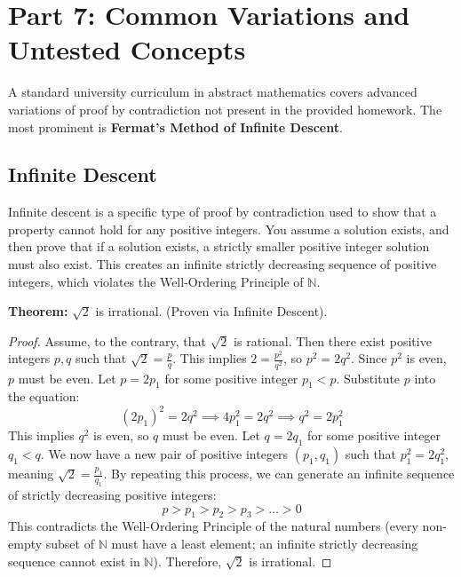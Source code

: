 \documentclass[11pt, letterpaper]{article}
\theoremstyle{remark}
\newcommand{\N}{\mathbb{N}}
\begin{document}
\newpage
\section{Part 7: Common Variations and Untested Concepts}

A standard university curriculum in abstract mathematics covers advanced variations of proof by contradiction not present in the provided homework. The most prominent is \textbf{Fermat's Method of Infinite Descent}.

\subsection{Infinite Descent}
Infinite descent is a specific type of proof by contradiction used to show that a property cannot hold for any positive integers. You assume a solution exists, and then prove that if a solution exists, a strictly smaller positive integer solution must also exist. This creates an infinite strictly decreasing sequence of positive integers, which violates the Well-Ordering Principle of $\N$.

\textbf{Theorem:} $\sqrt{2}$ is irrational. (Proven via Infinite Descent).
\begin{proof}
Assume, to the contrary, that $\sqrt{2}$ is rational. Then there exist positive integers $p, q$ such that $\sqrt{2} = \frac{p}{q}$.
This implies $2 = \frac{p^2}{q^2}$, so $p^2 = 2q^2$.
Since $p^2$ is even, $p$ must be even. Let $p = 2p_1$ for some positive integer $p_1 < p$.
Substitute $p$ into the equation:
\[ (2p_1)^2 = 2q^2 \implies 4p_1^2 = 2q^2 \implies q^2 = 2p_1^2 \]
This implies $q^2$ is even, so $q$ must be even. Let $q = 2q_1$ for some positive integer $q_1 < q$.
We now have a new pair of positive integers $(p_1, q_1)$ such that $p_1^2 = 2q_1^2$, meaning $\sqrt{2} = \frac{p_1}{q_1}$.
By repeating this process, we can generate an infinite sequence of strictly decreasing positive integers:
\[ p > p_1 > p_2 > p_3 > \dots > 0 \]
This contradicts the Well-Ordering Principle of the natural numbers (every non-empty subset of $\N$ must have a least element; an infinite strictly decreasing sequence cannot exist in $\N$).
Therefore, $\sqrt{2}$ is irrational.
\end{proof}

\newpage
\end{document}
